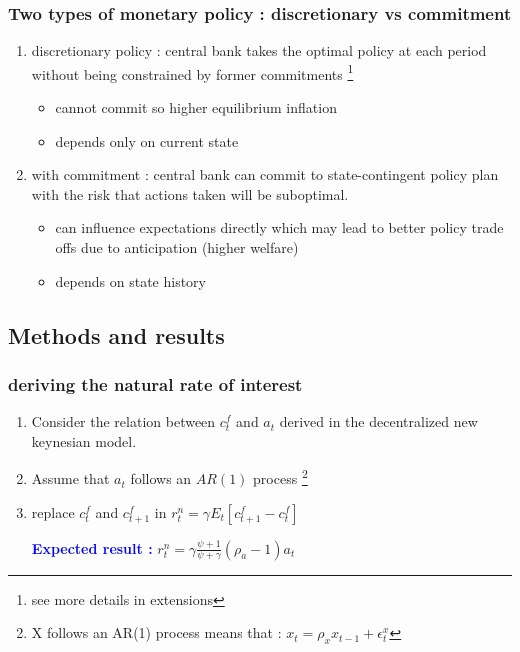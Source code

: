 \documentclass{article}
\begin{document}
\subsubsection{Two types of monetary policy : discretionary vs commitment}
\begin{enumerate}
    \item discretionary policy : central bank takes the optimal policy at each period without being constrained by former commitments \footnote{see more details in extensions}
    \begin{itemize}
        \item cannot commit so higher equilibrium inflation
        \item depends only on current state
    \end{itemize}
    \item with commitment : central bank can commit to state-contingent policy plan with the risk that actions taken will be suboptimal. 
    \begin{itemize}
        \item can influence expectations directly which may lead to better policy trade offs due to anticipation (higher welfare)
        \item depends on state history
    \end{itemize}
\end{enumerate}

\subsection{Methods and results}
\subsubsection{deriving the natural rate of interest}
\begin{enumerate}
    \item Consider the relation between $c_t^f$ and $a_t$ derived in the decentralized new keynesian model.
    \item Assume that $a_t$ follows an $AR(1)$ process \footnote{X follows an AR(1) process means that : $x_t=\rho_xx_{t-1}+\epsilon_t^x$}
    \item replace $c_t^f$ and $c_{t+1}^f$ in $r_t^n=\gamma E_t[c_{t+1}^f-c_t^f]$
    \begin{expectedresultsbox}
        \textcolor{blue}{\textbf{Expected result :}} $r_t^n=\gamma \frac{\psi+1}{\psi+\gamma}(\rho_a-1)a_t$
    \end{expectedresultsbox}
\end{enumerate}
\end{document}
